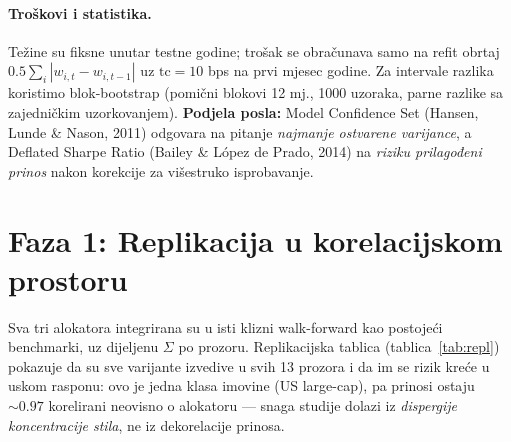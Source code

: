 \documentclass[11pt]{article}
\begin{document}
\paragraph{Troškovi i statistika.} Težine su fiksne unutar testne godine; trošak
se obračunava samo na refit obrtaj $0.5\sum_i|w_{i,t}-w_{i,t-1}|$ uz
$\text{tc}=10$ bps na prvi mjesec godine. Za intervale razlika koristimo
blok-bootstrap (pomični blokovi 12 mj., 1000 uzoraka, parne razlike sa
zajedničkim uzorkovanjem). \textbf{Podjela posla:} Model Confidence Set
(Hansen, Lunde \& Nason, 2011) odgovara na pitanje \emph{najmanje ostvarene
varijance}, a Deflated Sharpe Ratio (Bailey \& López de Prado, 2014) na
\emph{riziku prilagođeni prinos} nakon korekcije za višestruko isprobavanje.

\section{Faza 1: Replikacija u korelacijskom prostoru}

Sva tri alokatora integrirana su u isti klizni walk-forward kao postojeći
benchmarki, uz dijeljenu $\Sigma$ po prozoru. Replikacijska tablica
(tablica~\ref{tab:repl}) pokazuje da su sve varijante izvedive u svih 13 prozora
i da im se rizik kreće u uskom rasponu: ovo je jedna klasa imovine (US large-cap),
pa prinosi ostaju $\sim 0.97$ korelirani neovisno o alokatoru --- snaga studije
dolazi iz \emph{dispergije koncentracije stila}, ne iz dekorelacije prinosa.
\end{document}
